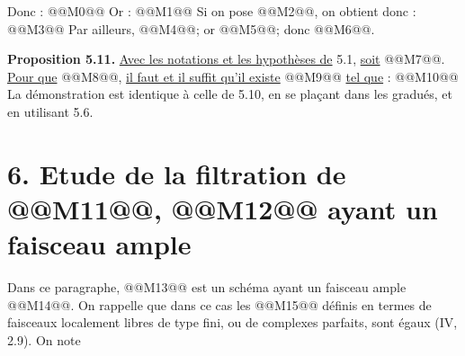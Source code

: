 
Donc :
@@M0@@
Or :
@@M1@@
Si on pose @@M2@@, on obtient donc :
@@M3@@
Par ailleurs, @@M4@@; or @@M5@@; donc @@M6@@.

\textbf{Proposition 5.11.} \uline{Avec les notations et les hypothèses de} 5.1, \uline{soit} @@M7@@. \uline{Pour que} @@M8@@, \uline{il faut et il suffit qu'il existe} @@M9@@ \uline{tel que} :
@@M10@@
La démonstration est identique à celle de 5.10, en se plaçant dans les gradués, et en utilisant 5.6.


\section*{6. Etude de la filtration de \texorpdfstring{@@M11@@}{K^{\bullet}(X)}, @@M12@@ ayant un faisceau ample}

Dans ce paragraphe, @@M13@@ est un schéma ayant un faisceau ample @@M14@@. On rappelle que dans ce cas les @@M15@@ définis en termes de faisceaux localement libres de type fini, ou de complexes parfaits, sont égaux (IV, 2.9). On note
